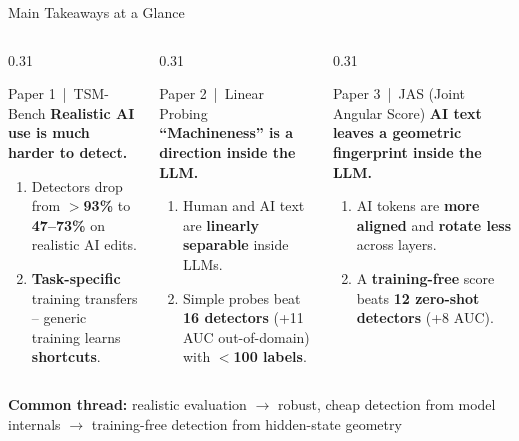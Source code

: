 \documentclass[aspectratio=169,xcolor=table]{beamer}
\begin{document}
\begin{frame}[label=glance]{Main Takeaways at a Glance}
  \begin{columns}[T]
    \begin{column}{0.31\textwidth}
      \begin{block}{Paper 1 \,|\, TSM-Bench}
        \small
        \textbf{Realistic AI use is much harder to detect.}
        \vspace{-2pt}\begin{enumerate}\footnotesize\setlength{\itemsep}{2pt}
          \item Detectors drop from \textbf{$>$93\%} to \textbf{47--73\%} on realistic AI edits.
          \item \textbf{Task-specific} training transfers -- generic training learns \textbf{shortcuts}.
        \end{enumerate}
      \end{block}
    \end{column}
    \begin{column}{0.31\textwidth}
      \begin{block}{Paper 2 \,|\, Linear Probing}
        \small
        \textbf{``Machineness'' is a direction inside the LLM.}
        \vspace{-2pt}\begin{enumerate}\footnotesize\setlength{\itemsep}{2pt}
          \item Human and AI text are \textbf{linearly separable} inside LLMs.
          \item Simple probes beat \textbf{16 detectors} (+11 AUC out-of-domain) with \textbf{$<$100 labels}.
        \end{enumerate}
      \end{block}
    \end{column}
    \begin{column}{0.31\textwidth}
      \begin{block}{Paper 3 \,|\, JAS (Joint Angular Score)}
        \small
        \textbf{AI text leaves a geometric fingerprint inside the LLM.}
        \vspace{-2pt}\begin{enumerate}\footnotesize\setlength{\itemsep}{2pt}
          \item AI tokens are \textbf{more aligned} and \textbf{rotate less} across layers.
          \item A \textbf{training-free} score beats \textbf{12 zero-shot detectors} (+8 AUC).
        \end{enumerate}
      \end{block}
    \end{column}
  \end{columns}
  \vspace{0.2cm}
  \begin{center}
    \small \textbf{Common thread:} realistic evaluation $\rightarrow$ robust, cheap detection
    from model internals $\rightarrow$ training-free detection from hidden-state geometry
  \end{center}
\end{frame}
\end{document}
